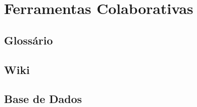 \chapter{Ferramentas Colaborativas}
\label{cap6}

\section{Glossário}

\section{Wiki}

\section{Base de Dados}

